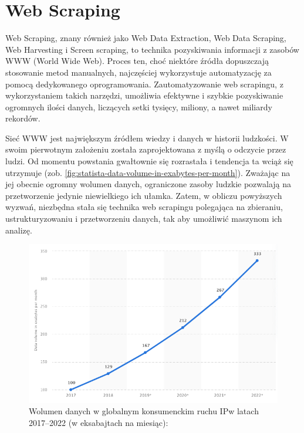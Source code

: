 \newpage


\section{Web Scraping}\label{sec:teoria}

Web Scraping, znany również jako Web Data Extraction, Web Data Scraping, Web Harvesting i Screen scraping, to technika pozyskiwania informacji z zasobów WWW (World Wide Web)\cite{Zhao2017}.
Proces ten, choć niektóre źródła dopuszczają stosowanie metod manualnych\cite{applications-and-tools}, najczęściej wykorzystuje automatyzację za pomocą dedykowanego oprogramowania.
Zautomatyzowanie web scrapingu, z wykorzystaniem takich narzędzi, umożliwia efektywne i szybkie pozyskiwanie ogromnych ilości danych, liczących setki tysięcy, miliony, a nawet miliardy rekordów.

Sieć WWW jest największym źródłem wiedzy i danych w historii ludzkości.
W swoim pierwotnym założeniu została zaprojektowana z myślą o odczycie przez ludzi.
Od momentu powstania gwałtownie się rozrastała i tendencja ta wciąż się utrzymuje (zob. \autoref{fig:statista-data-volume-in-exabytes-per-month}).
Zważając na jej obecnie ogromny wolumen danych, ograniczone zasoby ludzkie pozwalają na przetworzenie jedynie niewielkiego ich ułamka.
Zatem, w obliczu powyższych wyzwań, niezbędna stała się technika web scrapingu polegająca na zbieraniu, ustrukturyzowaniu i przetworzeniu danych, tak aby umożliwić maszynom ich analizę.

\begin{figure}[H]
    \centering
    \captionsetup{width=.8\linewidth}
    \includegraphics[width=\textwidth]{img/statista-data-volume-in-exabytes-per-month}
    \caption{Wolumen danych w globalnym konsumenckim ruchu IP\newline w latach 2017–2022 (w eksabajtach na miesiąc): ~\cite{statista-data-volume}}
    \label{fig:statista-data-volume-in-exabytes-per-month}
\end{figure}

